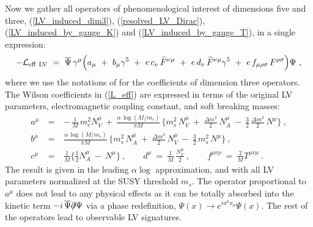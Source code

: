 \documentclass[12pt]{revtex4}
\newcommand{\slashed}[1]{\hbox{{$#1$}\llap{$/$}}}
\begin{document}
Now we gather all operators of phenomenological
interest of dimensions five and three, 
(\ref{LV_induced_dim3}), (\ref{resolved_LV_Dirac}),
(\ref{LV_induced_by_gauge_K}) and
(\ref{LV_induced_by_gauge_T}), in a single expression:
\begin{equation}
\label{L_eff}
 - \mathcal{L}_{\rm eff~LV}
         ~=~ 
\overline{\Psi}\, \gamma^\mu \Big( 
 a_\mu ~+~ b_\mu \gamma^5 
~+~ e\,c_\nu\,   \widetilde{F}^{\nu\mu} 
~+~  e\, d_\nu\,\widetilde{F}^{\nu\mu} \gamma^5
~+~e\, f_{\mu\rho\sigma}\,  F^{\rho\sigma} 
\Big) \Psi~, 
\end{equation} 
%
where we use the notations of \cite{Colladay:1998fq} for the
coefficients of dimension three operators. The Wilson coefficients in
(\ref{L_eff}) are expressed in terms of the original LV parameters,
electromagnetic coupling constant, and soft breaking masses: 
\begin{eqnarray}
\nonumber
        a^\mu & ~=~ &
         -\, \frac{1}{M}\, m_e^2 N_V^\mu 
        ~+~
        \frac{\alpha\, \log (M/m_s)}{\pi M}\, 
        \Big\{
         m_s^2\, N_V^\mu 
                ~+~
                 \frac{\Delta m^2}{2}\, 
                                             N_A^\mu
                ~-~
                \frac{3}{2}\, \frac{\Delta m^2}{2}\, 
                                               N^\mu  
        \Big\}~ ,
\\
\label{L_eff_coefs}
        b^\mu & ~=~ & 
        \frac{\alpha\,\log (M/m_s)}{\pi M} \, 
        \Big\{
                 m_s^2\, N_A^\mu
                ~+~
                 \frac{\Delta m^2}{2}\, 
                                             N_V^\mu
                ~-~
                \frac{3}{2}\, m_s^2\, N^\mu
        \Big\} ~,
\\
\nonumber
        c^\mu & ~=~ &
         \frac{1}{M}
        \Big\{ 
                \frac{1}{2}N_A^\mu
                ~-~
                N^\mu
        \Big\}~,\qquad 
        d^\mu ~=~
        \frac{1}{M}\, \frac{N_V^\mu}{2} 
~,\qquad 
        f^{\mu\nu\rho} ~ = ~
        \frac{2}{M} T^{\mu\nu\rho}
~.
\end{eqnarray}
%
The result is given in the leading $\alpha \log$ approximation, and with
all LV parameters normalized at the SUSY threshold
$m_s$. The operator proportional to $ a^\mu $ does not lead to 
any physical effects as it can be totally absorbed into
the kinetic term $ - i\, \overline{\Psi}\slashed{\partial}\Psi $
via a phase redefinition, $ \Psi(x) \to e^{i a^\mu x_\mu} \Psi(x) $.
The rest of the operators lead to observable LV signatures. 
\end{document}
